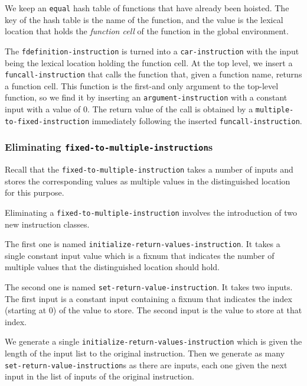 We keep an \texttt{equal} hash table of functions that have already
been hoisted.  The key of the hash table is the name of the function,
and the value is the lexical location that holds the \emph{function
  cell} of the function in the global environment.

The \texttt{fdefinition-instruction} is turned into a
\texttt{car-instruction} with the input being the lexical location
holding the function cell.  At the top level, we insert a
\texttt{funcall-instruction} that calls the function that, given a
function name, returns a function cell.  This function is the
first-and only argument to the top-level function, so we find it by
inserting an \texttt{argument-instruction} with a constant input with
a value of $0$.  The return value of the call is obtained by a
\texttt{multiple-to-fixed-instruction} immediately following the
inserted \texttt{funcall-instruction}.%

\subsubsection{Eliminating \texttt{fixed-to-multiple-instruction}s}

Recall that the \texttt{fixed-to-multiple-instruction} takes a
number of inputs and stores the corresponding values as multiple
values in the distinguished location for this purpose.

Eliminating a \texttt{fixed-to-multiple-instruction} involves the
introduction of two new instruction classes.

The first one is named \texttt{initialize-return-values-instruction}.
It takes a single constant input value which is a fixnum that
indicates the number of multiple values that the distinguished
location should hold.

The second one is named \texttt{set-return-value-instruction}.  It
takes two inputs.  The first input is a constant input containing a
fixnum that indicates the index (starting at 0) of the value to
store.  The second input is the value to store at that index.

We generate a single \texttt{initialize-return-values-instruction}
which is given the length of the input list to the original
instruction.  Then we generate as many
\texttt{set-return-value-instruction}s as there are inputs, each one
given the next input in the list of inputs of the original
instruction.

